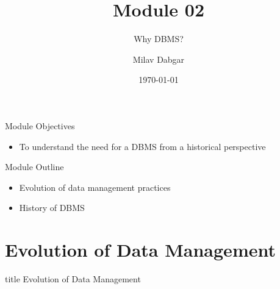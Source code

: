 \documentclass[aspectratio=169, xcolor=dvipsnames]{beamer}
\title{Module 02}
\subtitle{Why DBMS?}
\author{Milav Dabgar}
\institute{www.milav.in}
\date{\today}
\begin{document}
\begin{frame}
    \titlepage
\end{frame}

\begin{frame}{Module Objectives}
    \begin{itemize}[<+->]
        \item To understand the need for a DBMS from a historical perspective
    \end{itemize}
\end{frame}

\begin{frame}{Module Outline}
    \begin{itemize}[<+->]
        \item Evolution of data management practices
        \item History of DBMS
    \end{itemize}
\end{frame}

\section{Evolution of Data Management}

\begin{frame}
  \vfill
  \centering
  \begin{beamercolorbox}[sep=8pt,center,shadow=true,rounded=true]{title}
    Evolution of Data Management\par%
  \end{beamercolorbox}
  \vfill
\end{frame}
\end{document}
